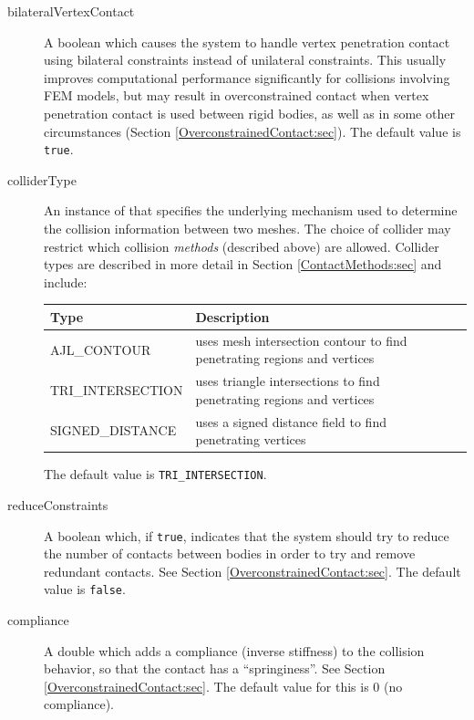 \begin{description}
\item[bilateralVertexContact]\mbox{}

A boolean which causes the system
to handle vertex penetration contact using bilateral constraints
instead of unilateral constraints.  This usually improves
computational performance significantly for collisions involving FEM
models, but may result in overconstrained contact when vertex penetration 
contact is used between rigid bodies, as well as in
some other circumstances (Section \ref{OverconstrainedContact:sec}).
The default value is {\tt true}.

\item[colliderType]\mbox{}

An instance of
that specifies the underlying mechanism used to determine the
collision information between two meshes. The choice of collider may
restrict which collision {\it methods} (described above) are
allowed. Collider types are described in more detail in 
Section \ref{ContactMethods:sec} and include:

\begin{tabular}{lll}
\hline
Type & Description \\
\hline
AJL\_CONTOUR & uses mesh intersection contour to find penetrating 
regions and vertices\\
TRI\_INTERSECTION & uses triangle intersections to find penetrating 
regions and vertices \\
SIGNED\_DISTANCE & uses a signed distance field to find penetrating vertices\\
\hline
\end{tabular}

The default value is {\tt TRI\_INTERSECTION}.

\item[reduceConstraints]\mbox{}

A boolean which, if {\tt true}, indicates that the system should try
to reduce the number of contacts between bodies in order to try and
remove redundant contacts. See Section
\ref{OverconstrainedContact:sec}.  The default value is {\tt false}.

\item[compliance]\mbox{}

A double which adds a compliance (inverse stiffness) to the collision
behavior, so that the contact has a ``springiness''.  See Section
\ref{OverconstrainedContact:sec}. The default value for this is 0 (no
compliance).


\end{description}
